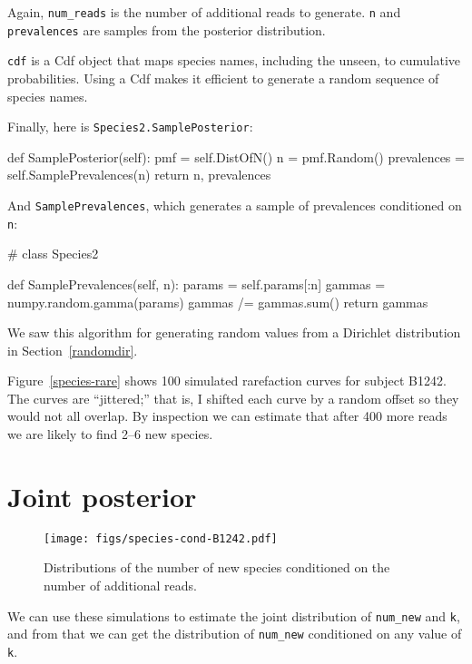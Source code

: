 \documentclass[12pt]{book}
\theoremstyle{exercise}
\newcommand{\py}[1]{{\tt #1}}%
\begin{document}
Again, \verb"num_reads" is the number of additional reads
to generate.  \py{n} and \py{prevalences} are samples from
the posterior distribution.

\py{cdf} is a Cdf object that maps species names, including the
unseen, to cumulative probabilities.  Using a Cdf makes it efficient
to generate a random sequence of species names.

Finally, here is \py{Species2.SamplePosterior}:

\begin{code}
    def SamplePosterior(self):
        pmf = self.DistOfN()
        n = pmf.Random()
        prevalences = self.SamplePrevalences(n)
        return n, prevalences
\end{code}

And \py{SamplePrevalences}, which generates a sample of
prevalences conditioned on \py{n}:

\begin{code}
# class Species2

    def SamplePrevalences(self, n):
        params = self.params[:n]
        gammas = numpy.random.gamma(params)
        gammas /= gammas.sum()
        return gammas
\end{code}

We saw this algorithm for generating random values from a Dirichlet
distribution in Section~\ref{randomdir}.

Figure~\ref{species-rare} shows 100 simulated rarefaction curves
for subject B1242.  The curves are ``jittered;''
that is, I shifted each curve by a random offset so they
would not all overlap.  By inspection we can estimate that after
400 more reads we are likely to find 2--6 new species.


\section{Joint posterior}

\begin{figure}
\centerline{\texttt{[image: figs/species-cond-B1242.pdf]}}
\caption{Distributions of the number of new species conditioned on
the number of additional reads.}
\label{species-cond}
\end{figure}

We can use these simulations to estimate the
joint distribution of \verb"num_new" and \py{k}, and from that
we can get the distribution of \verb"num_new" conditioned on any
value of \py{k}.
\end{document}
